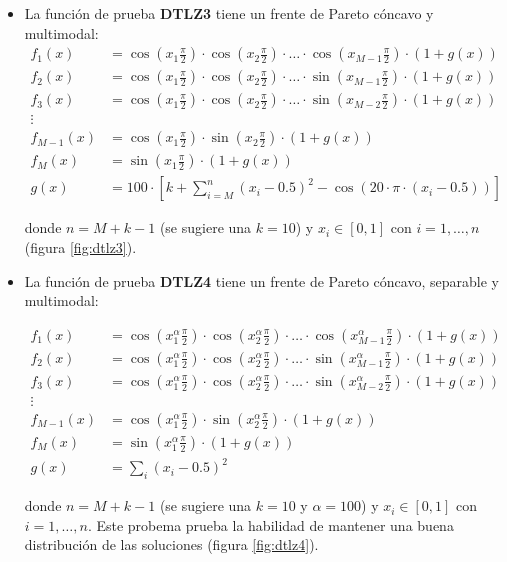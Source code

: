 \begin{itemize}
\item La funci\'on de prueba \textbf{DTLZ3} tiene un frente de Pareto c\'oncavo y multimodal:
\begin{align*}
f_1(x)&=\cos(x_1\frac{\pi}{2})\cdot\cos(x_2\frac{\pi}{2})\cdot\ldots\cdot \cos(x_{M-1}\frac{\pi}{2})\cdot(1+g(x))\\
f_2(x)&=\cos(x_1\frac{\pi}{2})\cdot\cos(x_2\frac{\pi}{2})\cdot\ldots\cdot \sin(x_{M-1}\frac{\pi}{2})\cdot(1+g(x))\\
f_3(x)&=\cos(x_1\frac{\pi}{2})\cdot\cos(x_2\frac{\pi}{2})\cdot\ldots\cdot \sin(x_{M-2}\frac{\pi}{2})\cdot(1+g(x))\\
\vdots&\\
f_{M-1}(x)&=\cos(x_1\frac{\pi}{2})\cdot\sin(x_2\frac{\pi}{2})\cdot(1+g(x))\\
f_{M}(x)&=\sin(x_1\frac{\pi}{2})\cdot (1+g(x))\\
g(x)&=100\cdot [k+\sum_{i=M}^n(x_i-0.5)^2-\cos(20\cdot\pi\cdot(x_i-0.5))]
\end{align*}

donde $n=M+k-1$ (se sugiere una $k=10$) y $x_i\in[0,1]$ con $i=1, \ldots, n$ (figura \ref{fig:dtlz3}).

\item La funci\'on de prueba \textbf{DTLZ4} tiene un frente de Pareto c\'oncavo, separable y multimodal:

\begin{align*}
f_1(x)&=\cos(x_1^\alpha\frac{\pi}{2})\cdot\cos(x_2^\alpha\frac{\pi}{2})\cdot\ldots\cdot \cos(x_{M-1}^\alpha\frac{\pi}{2})\cdot(1+g(x))\\
f_2(x)&=\cos(x_1^\alpha\frac{\pi}{2})\cdot\cos(x_2^\alpha\frac{\pi}{2})\cdot\ldots\cdot \sin(x_{M-1}^\alpha\frac{\pi}{2})\cdot(1+g(x))\\
f_3(x)&=\cos(x_1^\alpha\frac{\pi}{2})\cdot\cos(x_2^\alpha\frac{\pi}{2})\cdot\ldots\cdot \sin(x_{M-2}^\alpha\frac{\pi}{2})\cdot(1+g(x))\\
\vdots&\\
f_{M-1}(x)&=\cos(x_1^\alpha\frac{\pi}{2})\cdot\sin(x_2^\alpha\frac{\pi}{2})\cdot(1+g(x))\\
f_{M}(x)&=\sin(x_1^\alpha\frac{\pi}{2})\cdot(1+g(x))\\
g(x)&=\sum_i(x_i-0.5)^2
\end{align*}

donde $n=M+k-1$ (se sugiere una $k=10$ y $\alpha=100$) y $x_i\in[0,1]$ con $i=1,\ldots, n$. Este probema prueba la habilidad de mantener 
una buena distribuci\'on de las soluciones (figura \ref{fig:dtlz4}).


\end{itemize}
